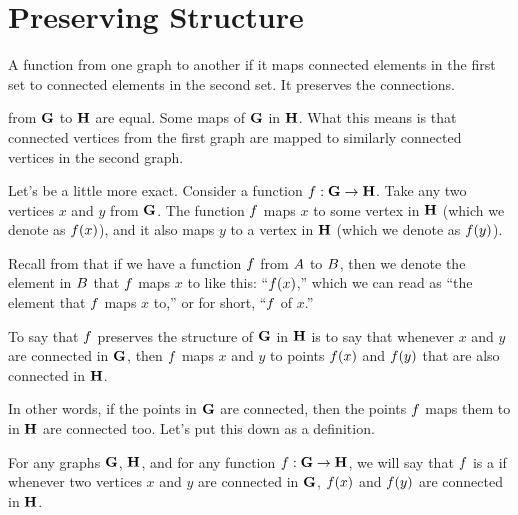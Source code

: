 \documentclass[../../../main.tex]{subfiles}
\begin{document}
\section{Preserving Structure}

\begin{terminology}
  A function from one graph to another  if it maps connected elements in the first set to connected elements in the second set. It preserves the connections.
\end{terminology}

 from $\mathbf{G}$ to $\mathbf{H}$ are equal. Some maps  of $\mathbf{G}$ in $\mathbf{H}$. What this means is that connected vertices from the first graph are mapped to similarly connected vertices in the second graph.

Let's be a little more exact. Consider a function $f: \mathbf{G} \rightarrow \mathbf{H}$. Take any two vertices $x$ and $y$ from $\mathbf{G}$. The function $f$ maps $x$ to some vertex in $\mathbf{H}$ (which we denote as $f(x)$), and it also maps $y$ to a vertex in $\mathbf{H}$ (which we denote as $f(y)$).

\begin{aside}
  \begin{remark}
    Recall from  that if we have a function $f$ from $A$ to $B$, then we denote the element in $B$ that $f$ maps $x$ to like this: ``$f(x)$,'' which we can read as ``the element that $f$ maps $x$ to,'' or for short, ``$f$ of $x$.''
  \end{remark}
\end{aside}

To say that $f$ preserves the structure of $\mathbf{G}$ in $\mathbf{H}$ is to say that whenever $x$ and $y$ are connected in $\mathbf{G}$, then $f$ maps $x$ and $y$ to points $f(x)$ and $f(y)$ that are also connected in $\mathbf{H}$. 

In other words, if the points in $\mathbf{G}$ are connected, then the points $f$ maps them to in $\mathbf{H}$ are connected too. Let's put this down as a definition.

\begin{fdefinition}
  \label{def:graph-structure-preserving-functions}
  For any graphs $\mathbf{G}$, $\mathbf{H}$, and for any function $f: \mathbf{G} \rightarrow \mathbf{H}$, we will say that $f$ is a  if whenever two vertices $x$ and $y$ are connected in $\mathbf{G}$, $f(x)$ and $f(y)$ are connected in $\mathbf{H}$.
\end{fdefinition}
\end{document}
